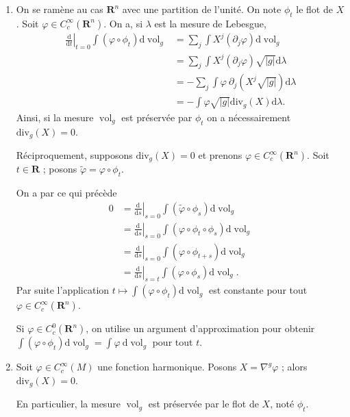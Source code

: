 \documentclass[a4paper,12pt,openany]{article}
\theoremstyle{plain}
\theoremstyle{definition}
\newcommand{\dd}{\mathrm{d}}
\newcommand{\vol}{\operatorname{vol}}
\newcommand{\R}{\mathbf{R}}
\begin{document}
\begin{enumerate}
\item On se ram\`ene au cas $\R^n$ avec une partition de l'unit\'e. On note $\phi_t$ le flot de $X$. Soit $\varphi \in C^\infty_c(\R^n)$.  On a, si $\lambda$ est la mesure de Lebesgue,
$$
\begin{aligned}
\left.\frac{\dd }{\dd t}\right|_{t=0} \int (\varphi \circ \phi_t) \dd \vol_g &= \sum_j \int X^j (\partial_j \varphi) \dd \vol_g  \\
&= \sum_j \int X^j (\partial_j \varphi) \sqrt{|g|} \dd \lambda \\
&= - \sum_j \int \varphi~ \partial_j \left(X^j \sqrt{|g|} \right) \dd \lambda  \\
&= - \int  \varphi \sqrt{|g|}\mathrm{div}_g(X) \dd \lambda. 
\end{aligned}
$$
Ainsi, si la mesure $\vol_g$ est pr\'eserv\'ee par $\phi_t$ on a n\'ecessairement $\mathrm{div}_g(X) = 0$. 



R\'eciproquement, supposons $\mathrm{div}_g(X) = 0$ et prenons $\varphi \in C^\infty_c(\R^n).$ Soit $t \in \R$ ; posons $\tilde \varphi = \varphi \circ \phi_t$.




On a par ce qui pr\'ec\`ede
$$
\begin{aligned}
0 &= \left.\frac{\dd}{\dd s}\right|_{s=0} \int (\tilde \varphi \circ \phi_s) \dd \vol_g  \\
&= \left.\frac{\dd}{\dd s}\right|_{s=0} \int  (\varphi \circ \phi_t \circ \phi_s) \dd \vol_g  \\
&= \left.\frac{\dd}{\dd s}\right|_{s=0} \int  (\varphi \circ \phi_{t+s}) \dd \vol_g  \\
&= \left.\frac{\dd}{\dd s}\right|_{s=t} \int  (\varphi \circ \phi_{s}) \dd \vol_g. 
\end{aligned}
$$
Par suite l'application $t \mapsto \int (\varphi \circ \phi_t) \dd \vol_g$ est constante pour tout $\varphi \in C^\infty_c(\R^n)$.



Si $\varphi \in C^0_c(\R^n)$, on utilise un argument d'approximation pour obtenir $\int(\varphi \circ \phi_t ) \dd \vol_g = \int \varphi ~\dd \vol_g$ pour tout $t$. 
\item Soit $\varphi \in C^\infty_c(M)$ une fonction harmonique. Posons $X = \nabla^{g}\varphi$ ; alors $\mathrm{div}_g(X) = 0$. 



En particulier, la mesure $\vol_g$ est pr\'eserv\'ee par le flot de $X$, not\'e $\phi_t$.




\end{enumerate}
\end{document}
